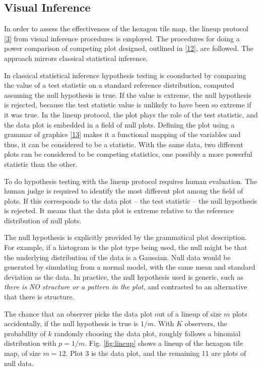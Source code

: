 \documentclass[conference,final,]{IEEEtran}
\begin{document}
\hypertarget{visual-inference}{%
\subsection{Visual Inference}\label{visual-inference}}

In order to assess the effectiveness of the hexagon tile map, the lineup protocol {[}\protect\hyperlink{ref-GIIV}{3}{]} from visual inference procedures is employed. The procedures for doing a power comparison of competing plot designed, outlined in {[}\protect\hyperlink{ref-GTPCCD}{12}{]}, are followed. The approach mirrors classical statistical inference.

In classical statistical inference hypothesis testing is coonducted by comparing the value of a test statistic on a standard reference distribution, computed assuming the null hypothesis is true. If the value is extreme, the null hypothesis is rejected, because the test statistic value is unlikely to have been so extreme if it was true. In the lineup protocol, the plot plays the role of the test statistic, and the data plot is embedded in a field of null plots. Defining the plot using a grammar of graphics {[}\protect\hyperlink{ref-ggplot2}{13}{]} makes it a functional mapping of the variables and thus, it can be considered to be a statistic. With the same data, two different plots can be considered to be competing statistics, one possibly a more powerful statistic than the other.

To do hypothesis testing with the lineup protocol requires human evaluation. The human judge is required to identify the most different plot among the field of plots. If this corresponds to the data plot -- the test statistic -- the null hypothesis is rejected. It means that the data plot is extreme relative to the reference distribution of null plots.

The null hypothesis is explicitly provided by the grammatical plot description. For example, if a histogram is the plot type being used, the null might be that the underlying distribution of the data is a Gaussian. Null data would be generated by simulating from a normal model, with the same mean and standard deviation as the data. In practice, the null hypothesis used is generic, such as \emph{there is NO structure or a pattern in the plot}, and contrasted to an alternative that there is structure.

The chance that an observer picks the data plot out of a lineup of size \(m\) plots accidentally, if the null hypothesis is true is \(1/m\). With \(K\) observers, the probability of \(k\) randomly choosing the data plot, roughly follows a binomial distribution with \(p=1/m\). Fig. \ref{fig:lineup} shows a lineup of the hexagon tile map, of size \(m=12\). Plot 3 is the data plot, and the remaining 11 are plots of null data.
\end{document}
